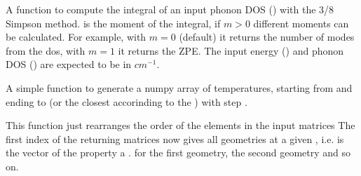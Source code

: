 \documentclass[letterpaper,10pt,english]{sphinxmanual}
\begin{document}

\begin{fulllineitems}
\label{pyqha:pyqha.thermo.dos_integral}
A function to compute the integral of an input phonon DOS () with the 3/8 Simpson method.
 is the moment of the integral, if \(m>0\) different moments can be calculated.
For example, with \(m=0\) (default) it returns the number of modes from the dos, 
with \(m=1\) it returns the ZPE. The input energy () and phonon DOS () are expected to be in
\(cm^{-1}\).

\end{fulllineitems}


\begin{fulllineitems}
\label{pyqha:pyqha.thermo.gen_TT}
A simple function to generate a numpy array of temperatures, starting from
 and ending to  (or the closest  accorinding to the  )
with step  .

\end{fulllineitems}


\begin{fulllineitems}
\label{pyqha:pyqha.thermo.rearrange_thermo}
This function just rearranges the order of the elements in the input matrices
The first index of the returning matrices  now gives all geometries at a given
, i.e.  is the vector of the property  a  .  for the first 
geometry,  the second geometry and so on.

\end{fulllineitems}
\end{document}
